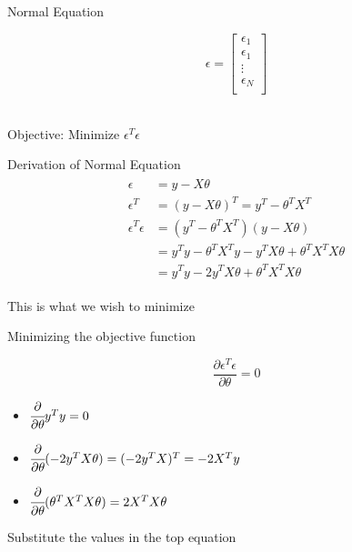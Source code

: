 \documentclass{beamer}
\begin{document}
\begin{frame}{Normal Equation}
    
\begin{equation*}
 \epsilon = 
\begin{bmatrix}
    \epsilon_{1} \\
    \epsilon_{1} \\
    \vdots \\
    \epsilon_{N} \\
\end{bmatrix}
\end{equation*}
\\
\begin{center}
 \pause Objective:   Minimize $\epsilon^{T}\epsilon$    
\end{center}
\end{frame}

\begin{frame}{Derivation of Normal Equation}
\begin{align*}
\label{eqn*:eqlabel}
\begin{split}
   \epsilon &= y - X\theta \\ 
\epsilon^{T} &= (y-X\theta)^{T} = y^{T} - \theta^{T}X^{T}\\
\epsilon^{T}\epsilon &= (y^{T} - \theta^{T}X^{T})(y - X\theta)\\
&=y^{T}y - \theta^{T}X^{T}y - y^{T}X\theta+\theta^{T}X^{T}X\theta\\
&=y^{T}y - 2y^{T}X\theta+\theta^{T}X^{T}X\theta
\end{split}
\end{align*}

This is what we wish to minimize
\end{frame}

\begin{frame}{Minimizing the objective function}
    
    
    \begin{equation}
        \frac{\partial \epsilon^{T} \epsilon}{\partial \theta} = 0    
    \end{equation}
    
    
    
    \begin{itemize}
        \item $
    \cfrac{\partial }{\partial \theta} y^{T}y= 0
    $
    \item $
    \cfrac{\partial }{\partial \theta}(-2y^{T}X\theta ) = (-2y^{T}X)^{T} = -2X^{T}y
    $
    \item $ \cfrac{\partial}{\partial\theta} (\theta^{T}X^{T}X\theta) = 2X^{T}X\theta$
    \end{itemize}
    
    Substitute the values in the top equation
    
\end{frame}
\end{document}
